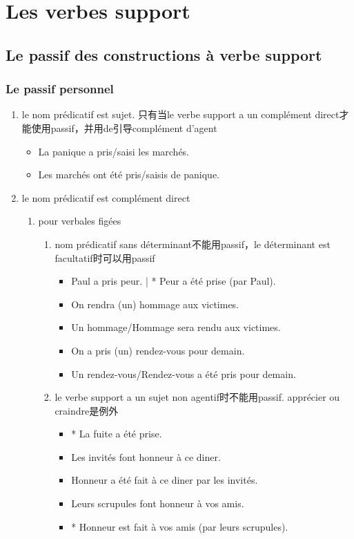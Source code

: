 \documentclass[UTF8]{report}
\begin{document}
\section{Les verbes support}

\subsection{Le passif des constructions à verbe support}

\subsubsection{Le passif personnel}
\begin{enumerate}
    \item le nom prédicatif est sujet. 只有当le verbe support a un complément direct才能使用passif，并用de引导complément d’agent
    \begin{itemize}
        \item La panique a pris/saisi les marchés.
        \item Les marchés ont été pris/saisis de panique.
    \end{itemize}
    \item le nom prédicatif est complément direct
    \begin{enumerate}
        \item pour verbales figées
        \begin{enumerate}
            \item nom prédicatif sans déterminant不能用passif，le déterminant est facultatif时可以用passif
            \begin{itemize}
                \item Paul a pris peur. | * Peur a été prise (par Paul).
                \item On rendra (un) hommage aux victimes.
                \item Un hommage/Hommage sera rendu aux victimes.
                \item On a pris (un) rendez-vous pour demain.
                \item Un rendez-vous/Rendez-vous a été pris pour demain.
            \end{itemize}
            \item le verbe support a un sujet non agentif时不能用passif. apprécier ou craindre是例外
            \begin{itemize}
                \item * La fuite a été prise.
                \item Les invités font honneur à ce diner.
                \item Honneur a été fait à ce diner par les invités.
                \item Leurs scrupules font honneur à vos amis.
                \item * Honneur est fait à vos amis (par leurs scrupules).
            \end{itemize}
        \end{enumerate}


\end{enumerate}
\end{enumerate}
\end{document}
